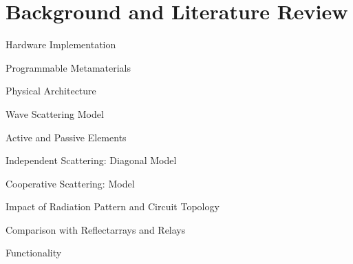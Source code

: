 
\graphicspath{{assets/chapter_2/}}

\chapter{Background and Literature Review}

\begin{section}{}


	\begin{subsection}{Hardware Implementation}
		\begin{subsubsection}{Programmable Metamaterials}

		\end{subsubsection}

		\begin{subsubsection}{Physical Architecture}

		\end{subsubsection}
	\end{subsection}

	\begin{subsection}{Wave Scattering Model}
		\begin{subsubsection}{Active and Passive Elements}

		\end{subsubsection}

		\begin{subsubsection}{Independent Scattering: Diagonal Model}

		\end{subsubsection}

		\begin{subsubsection}{Cooperative Scattering:  Model}

		\end{subsubsection}

		\begin{subsubsection}{Impact of Radiation Pattern and Circuit Topology}

		\end{subsubsection}
	\end{subsection}

	\begin{subsection}{Comparison with Reflectarrays and Relays}
		\begin{subsubsection}{Functionality}


\end{subsubsection}
\end{subsection}
\end{section}
